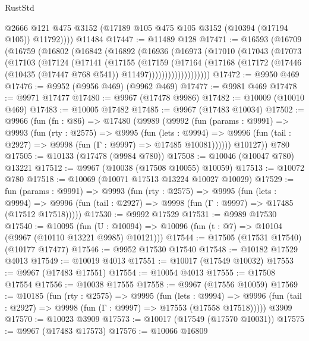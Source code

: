 \begin{lexlean}{RustStd}
\begin{coremodule}
          @2666
          @121
          @475
          @3152
          (@17189 @105 @475 @105 @3152 (@10394 (@17194 @105)) @11792))))
    @11484
@17447 := @11489 @128
@17471 := @16593
    (@16709
      (@16759
        (@16802
          (@16842
            (@16892
              (@16936
                (@16973
                  (@17010
                    (@17043
                      (@17073
                        (@17103
                          (@17124
                            (@17141
                              (@17155
                                (@17159
                                  (@17164
                                    (@17168
                                      (@17172
                                        (@17446
                                          (@10435 (@17447 @768 @541))
                                          @11497)))))))))))))))))))
@17472 := @9950 @469
@17476 := @9952 (@9956 @469) (@9962 @469)
@17477 := @9981 @469
@17478 := @9971 @17477
@17480 := @9967 (@17478 @9986)
@17482 := @10009 (@10010 @469)
@17483 := @10005 @17482
@17485 := @9967 (@17483 @10034)
@17502 := @9966
    (fun (fn : @86) =>
    @17480
      (@9989
        (@9992
          (fun (params : @9991) =>
          @9993
            (fun (rty : @2575) =>
            @9995
              (fun (lets : @9994) =>
              @9996 (fun (tail : @2927) => @9998 (fun (Γ : @9997) => @17485 @10081))))))
        @10127))
    @780
@17505 := @10133 (@17478 (@9984 @780))
@17508 := @10046 (@10047 @780) @13221
@17512 := @9967 (@10038 (@17508 @10055) @10059)
@17513 := @10072 @780
@17518 := @10069 (@10071 @17513 @13224 @10027 @10029)
@17529 := fun (params : @9991) =>
  @9993
    (fun (rty : @2575) =>
    @9995
      (fun (lets : @9994) =>
      @9996 (fun (tail : @2927) => @9998 (fun (Γ : @9997) => @17485 (@17512 @17518)))))
@17530 := @9992 @17529
@17531 := @9989 @17530
@17540 := @10095
    (fun (U : @10094) => @10096 (fun (t : @7) => @10104 (@9967 (@10110 @13221 @9985) @10121)))
@17544 := @17505 (@17531 @17540) (@10177 @17477)
@17546 := @9952 @17530 @17540
@17548 := @10182 @17529 @4013
@17549 := @10019 @4013
@17551 := @10017 (@17549 @10032)
@17553 := @9967 (@17483 @17551)
@17554 := @10054 @4013
@17555 := @17508 @17554
@17556 := @10038 @17555
@17558 := @9967 (@17556 @10059)
@17569 := @10185
    (fun (rty : @2575) =>
    @9995
      (fun (lets : @9994) =>
      @9996 (fun (tail : @2927) => @9998 (fun (Γ : @9997) => @17553 (@17558 @17518)))))
    @3909
@17570 := @10023 @3909
@17573 := @10017 (@17549 (@17570 @10031))
@17575 := @9967 (@17483 @17573)
@17576 := @10066 @16809

\end{coremodule}
\end{lexlean}
